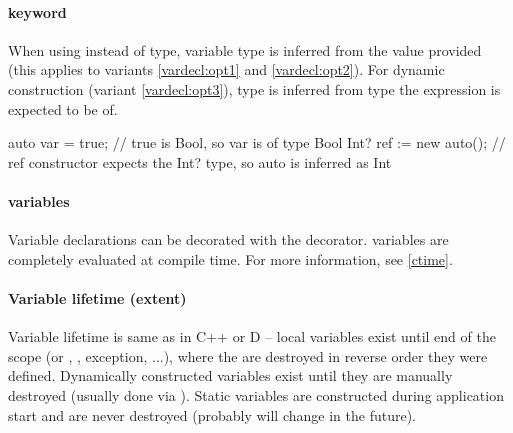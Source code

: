 \paragraph{ keyword}
When using  instead of type, variable type is inferred from the value provided (this applies to variants \ref{vardecl:opt1} and \ref{vardecl:opt2}). For dynamic construction (variant \ref{vardecl:opt3}), type is inferred from type the expression is expected to be of.

\begin{code}
auto var = true; // true is Bool, so var is of type Bool
Int? ref := new auto(); // ref constructor expects the Int? type, so auto is inferred as Int
\end{code}

\paragraph{ variables}
Variable declarations can be decorated with the  decorator. \ctime variables are completely evaluated at compile time. For more information, see \autoref{ctime}.

\paragraph{Variable lifetime (extent)} Variable lifetime is same as in C++ or D -- local variables exist until end of the scope (or , , exception, ...), where the are destroyed in reverse order they were defined. Dynamically constructed variables exist until they are manually destroyed (usually done via ). Static variables are constructed during application start and are never destroyed (probably will change in the future).

